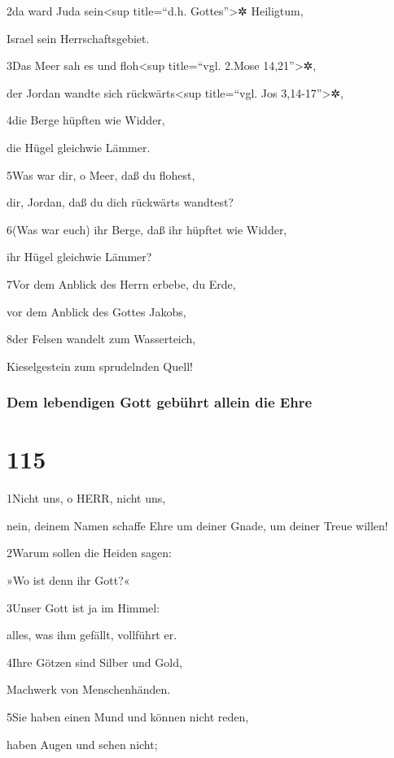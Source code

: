 2da ward Juda sein\textless sup title=``d.h. Gottes''\textgreater✲
Heiligtum,

Israel sein Herrschaftsgebiet.

3Das Meer sah es und floh\textless sup title=``vgl. 2.Mose
14,21''\textgreater✲,

der Jordan wandte sich rückwärts\textless sup title=``vgl. Jos
3,14-17''\textgreater✲,

4die Berge hüpften wie Widder,

die Hügel gleichwie Lämmer.

5Was war dir, o Meer, daß du flohest,

dir, Jordan, daß du dich rückwärts wandtest?

6(Was war euch) ihr Berge, daß ihr hüpftet wie Widder,

ihr Hügel gleichwie Lämmer?

7Vor dem Anblick des Herrn erbebe, du Erde,

vor dem Anblick des Gottes Jakobs,

8der Felsen wandelt zum Wasserteich,

Kieselgestein zum sprudelnden Quell!

\hypertarget{dem-lebendigen-gott-gebuxfchrt-allein-die-ehre}{%
\subsubsection{Dem lebendigen Gott gebührt allein die
Ehre}\label{dem-lebendigen-gott-gebuxfchrt-allein-die-ehre}}

\hypertarget{section-114}{%
\section{115}\label{section-114}}

1Nicht uns, o HERR, nicht uns,

nein, deinem Namen schaffe Ehre um deiner Gnade, um deiner Treue willen!

2Warum sollen die Heiden sagen:

»Wo ist denn ihr Gott?«

3Unser Gott ist ja im Himmel:

alles, was ihm gefällt, vollführt er.

4Ihre Götzen sind Silber und Gold,

Machwerk von Menschenhänden.

5Sie haben einen Mund und können nicht reden,

haben Augen und sehen nicht;

